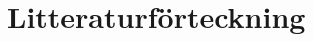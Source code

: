 \onecolumn
\chapter*{Litteraturförteckning}
\label{ch:litteratur}

\begin{flushleft}
  \renewcommand{\chapter}[2]{}%
  
  
\end{flushleft}

\twocolumn










